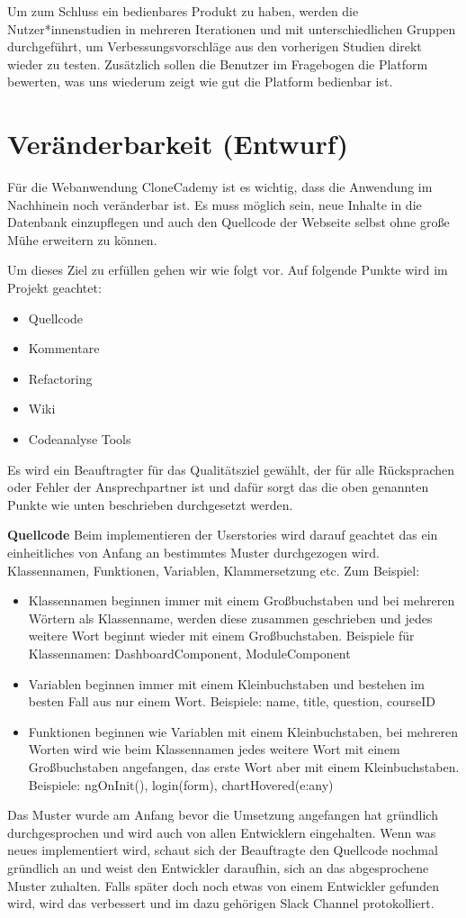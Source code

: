 \documentclass[accentcolor=tud0b,12pt,paper=a4]{tudreport}
\begin{document}
Um zum Schluss ein bedienbares Produkt zu haben, werden die Nutzer*innenstudien in mehreren Iterationen und mit unterschiedlichen Gruppen durchgeführt, um Verbessungsvorschläge aus den vorherigen Studien direkt wieder zu testen. Zusätzlich sollen die Benutzer im Fragebogen die Platform bewerten, was uns wiederum zeigt wie gut die Platform bedienbar ist.
\section{Veränderbarkeit (Entwurf)}
Für die Webanwendung CloneCademy ist es wichtig, dass die Anwendung im Nachhinein noch veränderbar ist. Es muss möglich sein, neue Inhalte in die Datenbank einzupflegen und auch den Quellcode der Webseite selbst ohne große Mühe erweitern zu können.

Um dieses Ziel zu erfüllen gehen wir wie folgt vor. Auf folgende Punkte wird im Projekt geachtet:
\begin{itemize}
	\item Quellcode
	\item Kommentare
	\item Refactoring
	\item Wiki
	\item Codeanalyse Tools
\end{itemize}

Es wird ein Beauftragter für das Qualitätsziel gewählt, der für alle Rücksprachen oder Fehler der Ansprechpartner ist und dafür sorgt das die oben genannten Punkte wie unten beschrieben durchgesetzt werden.

\textbf{Quellcode}
Beim implementieren der Userstories wird darauf geachtet das ein einheitliches von Anfang an bestimmtes Muster durchgezogen wird. Klassennamen, Funktionen, Variablen, Klammersetzung etc. Zum Beispiel:
\begin{itemize}
\item Klassennamen beginnen immer mit einem Großbuchstaben und bei mehreren Wörtern als Klassenname, werden diese zusammen geschrieben und jedes weitere Wort beginnt wieder mit einem Großbuchstaben. Beispiele für Klassennamen: DashboardComponent, ModuleComponent
\item Variablen beginnen immer mit einem Kleinbuchstaben und bestehen im besten Fall aus nur einem Wort. Beispiele: name, title, question, courseID
\item Funktionen beginnen wie Variablen mit einem Kleinbuchstaben, bei mehreren Worten wird wie beim Klassennamen jedes weitere Wort mit einem Großbuchstaben angefangen, das erste Wort aber mit einem Kleinbuchstaben. Beispiele: ngOnInit(), login(form), chartHovered(e:any)
\end{itemize}
Das Muster wurde am Anfang bevor die Umsetzung angefangen hat gründlich durchgesprochen und wird auch von allen Entwicklern eingehalten. Wenn was neues implementiert wird, schaut sich der Beauftragte den Quellcode nochmal gründlich an und weist den Entwickler daraufhin, sich an das abgesprochene Muster zuhalten. Falls später doch noch etwas von einem Entwickler gefunden wird,  wird das verbessert und im dazu gehörigen Slack Channel protokolliert.
\end{document}
